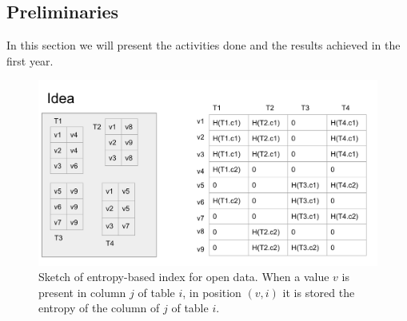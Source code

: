 \subsection{Preliminaries}\label{sub_preliminaries}
In this section we will present the activities done and the results achieved in the first year.

\begin{figure}[t]\label{index_sketch}
    \includegraphics[scale=0.4]{figures/index_sketch.png}
    \caption{Sketch of entropy-based index for open data. When a value $v$ is present in column $j$ of table $i$, in position $(v,i)$ it is stored the entropy of the column of $j$ of table $i$.}
\end{figure}

